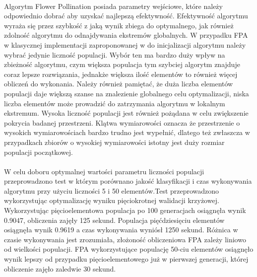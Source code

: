 \documentclass[a4paper,12pt,twoside]{article}
\begin{document}
\paragraph{}
Algorytm Flower Pollination posiada parametry wejściowe, które należy odpowiednio dobrać aby uzyskać najlepszą efektywność. Efektywność algorytmu wyraża się przez szybkość z jaką wynik zbiega do optymalnego, jak również zdolność algorytmu do odnajdywania ekstremów globalnych. W przypadku FPA w klasycznej implementacji zaproponowanej w \cite{FPA} do inicjalizacji algorytmu należy wybrać jedynie liczność populacji. Wybór ten ma bardzo duży wpływ na zbieżność algorytmu, czym większa populacja tym szybciej algorytm znajduje coraz lepsze rozwiązania, jednakże większa ilość elementów to również więcej obliczeń do wykonania.  Należy również pamiętać, że duża liczba elementów populacji daje większą szanse na znalezienie globalnego celu optymalizacji, niska liczba elementów może prowadzić do zatrzymania algorytmu w lokalnym ekstremum. Wysoka liczność populacji jest również pożądana w celu zwiększenie pokrycia badanej przestrzeni. Klątwa wymiarowości oznacza że przestrzenie o wysokich wymiarowościach bardzo trudno jest wypełnić, dlatego też zwłaszcza w przypadkach zbiorów o wysokiej wymiarowości istotny jest duży rozmiar populacji początkowej.
\paragraph{}
W celu doboru optymalnej wartości parametru liczności populacji przeprowadzono test w którym porównano jakość klasyfikacji i czas wykonywania algorytmu przy użyciu liczności 5 i 50 elementów.Test przeprowadzono wykorzystując optymalizację wyniku pięciokrotnej walidacji krzyżowej. Wykorzystując pięcioelementowa populacja po 100 generacjach osiągnęła wynik 0.9047, obliczenia zajęły 125 sekund. Populacja pięćdziesięciu elementów osiągnęła wynik 0.9619 a czas wykonywania wyniósł 1250 sekund. Różnica w czasie wykonywania jest zrozumiała, złożoność obliczeniowa FPA zależy liniowo od wielkości populacji. FPA wykorzystujące populację 50-ciu elementów osiągnęło wynik lepszy od przypadku pięcioelementowego już w pierwszej generacji, której obliczenie zajęło zaledwie 30 sekund. 
\end{document}
